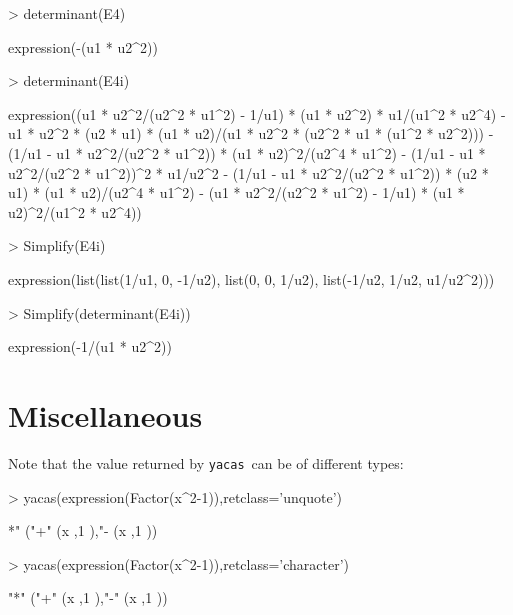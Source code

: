 \documentclass[]{article}
\newcommand{\yacas}{{\tt yacas}}
\begin{document}
\begin{Schunk}
\begin{Sinput}
> determinant(E4)
\end{Sinput}
\begin{Soutput}
expression(-(u1 * u2^2))
\end{Soutput}
\begin{Sinput}
> determinant(E4i)
\end{Sinput}
\begin{Soutput}
expression((u1 * u2^2/(u2^2 * u1^2) - 1/u1) * (u1 * u2^2) * u1/(u1^2 * 
    u2^4) - u1 * u2^2 * (u2 * u1) * (u1 * u2)/(u1 * u2^2 * (u2^2 * 
    u1 * (u1^2 * u2^2))) - (1/u1 - u1 * u2^2/(u2^2 * u1^2)) * 
    (u1 * u2)^2/(u2^4 * u1^2) - (1/u1 - u1 * u2^2/(u2^2 * u1^2))^2 * 
    u1/u2^2 - (1/u1 - u1 * u2^2/(u2^2 * u1^2)) * (u2 * u1) * 
    (u1 * u2)/(u2^4 * u1^2) - (u1 * u2^2/(u2^2 * u1^2) - 1/u1) * 
    (u1 * u2)^2/(u1^2 * u2^4))
\end{Soutput}
\begin{Sinput}
> Simplify(E4i)
\end{Sinput}
\begin{Soutput}
expression(list(list(1/u1, 0, -1/u2), list(0, 0, 1/u2), list(-1/u2, 
    1/u2, u1/u2^2)))
\end{Soutput}
\begin{Sinput}
> Simplify(determinant(E4i))
\end{Sinput}
\begin{Soutput}
expression(-1/(u1 * u2^2))
\end{Soutput}
\end{Schunk}



\section{Miscellaneous} 
\label{sec:misc}



Note that the value returned by \yacas\ can be of different types:
\begin{Schunk}
\begin{Sinput}
> yacas(expression(Factor(x^2-1)),retclass='unquote')
\end{Sinput}
\begin{Soutput}
*" ("+" (x ,1 ),"- (x ,1 ))
\end{Soutput}
\begin{Sinput}
> yacas(expression(Factor(x^2-1)),retclass='character')
\end{Sinput}
\begin{Soutput}
"*" ("+" (x ,1 ),"-" (x ,1 ))
\end{Soutput}
\end{Schunk}
\end{document}
